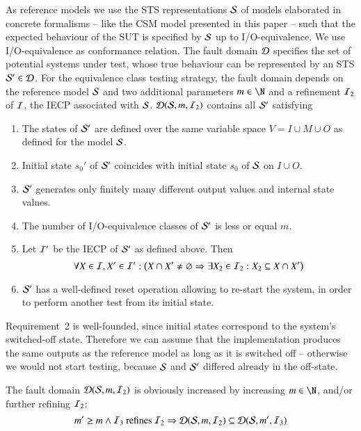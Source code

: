 As reference models we use the STS representations ${\cal S}$ of models elaborated in concrete formalisms -- like the CSM model presented in this paper -- such that the expected behaviour of the SUT is specified by ${\cal S}$ up to I/O-equivalence. We use  I/O-equivalence as conformance relation.
The fault domain ${\cal D}$ specifies the set of potential systems under test, whose   true behaviour can be represented by an STS  ${\cal S}'\in {\cal D}$. For the equivalence class testing strategy, the
 fault domain depends on the reference model ${\cal S}$  and two additional parameters $m\in \N$ and
a refinement ${\cal I}_2$ of ${\cal I}$, the IECP associated with ${\cal S}$.  ${\cal D}({\cal S},m,{\cal I}_2)$ contains all ${\cal S}'$ satisfying 
\begin{enumerate}
\item The states of ${\cal S}'$ are defined over the same variable space $V = I\cup M \cup O$ as 
defined for the model ${\cal S}$.

\item Initial state $s_0'$ of ${\cal S}'$ coincides with initial state 
$s_0$ of ${\cal S}$ on $I\cup O$. 

\item ${\cal S}'$ generates only finitely many different output values and internal state values.

\item The number of I/O-equivalence classes of ${\cal S}'$ is less or equal $m$.

 

\item  Let ${\cal I}'$ be the IECP of  ${\cal S}'$ as defined above. Then  
$$
\forall X\in {\cal I}, X'\in {\cal I}': \big(X\cap X'\neq\varnothing \Rightarrow
\exists X_2\in {\cal I}_2: X_2 \subseteq X\cap X'\big)
$$

\item ${\cal S}'$ has a well-defined reset operation allowing to re-start the system, in order to perform another test from its initial state.

\end{enumerate}

Requirement~2 is well-founded, since initial states correspond to the system's switched-off state.
Therefore we can assume that the implementation produces the
same outputs as the reference model as long as it is switched off -- 
otherwise we would not start testing, because ${\cal S}$ and ${\cal S}'$ 
differed already in the off-state.

The fault domain ${\cal D}({\cal S},m,{\cal I}_2)$   is obviously 
increased by increasing $m\in \N$, and/or further refining ${\cal I}_2$:
$$
m' \ge m \wedge {\cal I}_3\ \text{refines}\ {\cal I}_2 \Rightarrow
 {\cal D}({\cal S},m,{\cal I}_2)\subseteq {\cal D}({\cal S},m',{\cal I}_3)
$$


